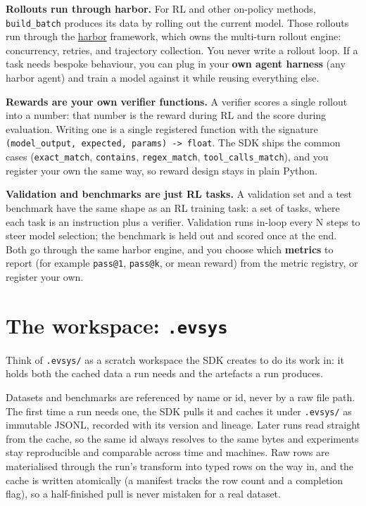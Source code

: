 \documentclass[11pt]{article}
\newcommand{\code}[1]{\texttt{\small #1}}
\begin{document}
\textbf{Rollouts run through harbor.} For RL and other on-policy methods,
\code{build\_batch} produces its data by rolling out the current model. Those
rollouts run through the \href{https://github.com/harbor-framework/harbor}{harbor}
framework, which owns the multi-turn rollout engine: concurrency, retries, and
trajectory collection. You never write a rollout loop. If a task needs bespoke
behaviour, you can plug in your \textbf{own agent harness} (any harbor agent) and
train a model against it while reusing everything else.

\textbf{Rewards are your own verifier functions.} A verifier scores a single
rollout into a number: that number is the reward during RL and the score during
evaluation. Writing one is a single registered function with the signature
\code{(model\_output, expected, params) -> float}. The SDK ships the common cases
(\code{exact\_match}, \code{contains}, \code{regex\_match},
\code{tool\_calls\_match}), and you register your own the same way, so reward
design stays in plain Python.

\textbf{Validation and benchmarks are just RL tasks.} A validation set and a test
benchmark have the same shape as an RL training task: a set of tasks, where each
task is an instruction plus a verifier. Validation runs in-loop every N steps to
steer model selection; the benchmark is held out and scored once at the end.
Both go through the same harbor engine, and you choose which \textbf{metrics} to
report (for example \code{pass@1}, \code{pass@k}, or mean reward) from the metric
registry, or register your own.

\section{The workspace: \code{.evsys}}

Think of \code{.evsys/} as a scratch workspace the SDK creates to do its work
in: it holds both the cached data a run needs and the artefacts a run produces.

Datasets and benchmarks are referenced by name or id, never by a raw file path.
The first time a run needs one, the SDK pulls it and caches it under
\code{.evsys/} as immutable JSONL, recorded with its version and lineage. Later
runs read straight from the cache, so the same id always resolves to the same
bytes and experiments stay reproducible and comparable across time and machines.
Raw rows are materialised through the run's transform into typed rows on the way
in, and the cache is written atomically (a manifest tracks the row count and a
completion flag), so a half-finished pull is never mistaken for a real dataset.
\end{document}
